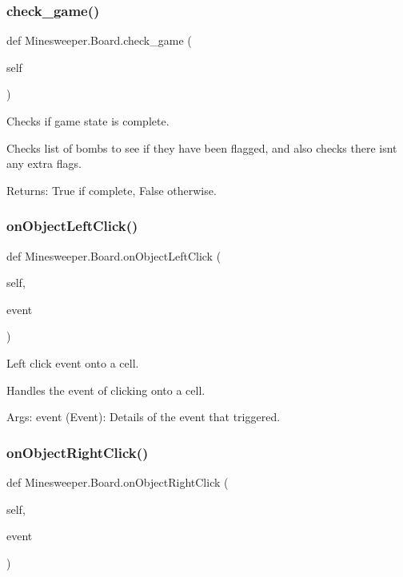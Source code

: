 \subsubsection{\texorpdfstring{check\+\_\+game()}{check\_game()}}
{\footnotesize\ttfamily def Minesweeper.\+Board.\+check\+\_\+game (\begin{DoxyParamCaption}\item[{}]{self }\end{DoxyParamCaption})}

\begin{DoxyVerb}Checks if game state is complete.

Checks list of bombs to see if they have been flagged, and also checks
there isnt any extra flags.

Returns:
    True if complete, False otherwise.
\end{DoxyVerb}
 \mbox{\label{class_minesweeper_1_1_board_a7e283de1291a4ed985a6099dcbbd4962}} 
\subsubsection{\texorpdfstring{on\+Object\+Left\+Click()}{onObjectLeftClick()}}
{\footnotesize\ttfamily def Minesweeper.\+Board.\+on\+Object\+Left\+Click (\begin{DoxyParamCaption}\item[{}]{self,  }\item[{}]{event }\end{DoxyParamCaption})}

\begin{DoxyVerb}Left click event onto a cell.

Handles the event of clicking onto a cell.

Args:
    event (Event): Details of the event that triggered.
\end{DoxyVerb}
 \mbox{\label{class_minesweeper_1_1_board_abce9d7c9117d2e09520dcb5f39642182}} 
\subsubsection{\texorpdfstring{on\+Object\+Right\+Click()}{onObjectRightClick()}}
{\footnotesize\ttfamily def Minesweeper.\+Board.\+on\+Object\+Right\+Click (\begin{DoxyParamCaption}\item[{}]{self,  }\item[{}]{event }\end{DoxyParamCaption})}

